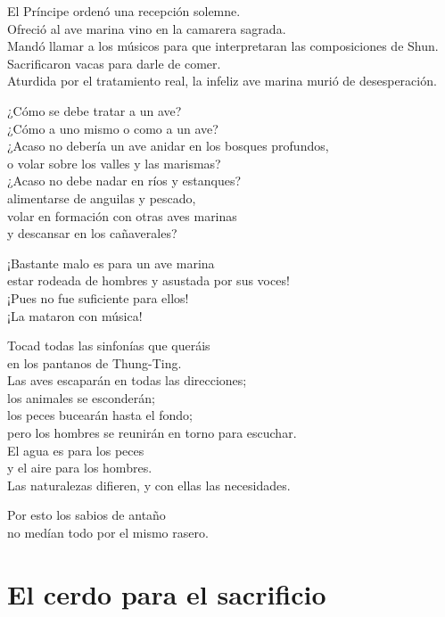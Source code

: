 \documentclass[hidelinks]{memoir}
\begin{document}
	El Príncipe ordenó una recepción solemne.\\
	Ofreció al ave marina vino en la camarera sagrada.\\
	Mandó llamar a los músicos para que interpretaran las composiciones de
	Shun.\\
	Sacrificaron vacas para darle de comer.\\
	Aturdida por el tratamiento real, la infeliz ave marina murió de
	desesperación.
	
	¿Cómo se debe tratar a un ave?\\
	¿Cómo a uno mismo o como a un ave?\\
	¿Acaso no debería un ave anidar en los bosques profundos,\\
	o volar sobre los valles y las marismas?\\
	¿Acaso no debe nadar en ríos y estanques?\\
	alimentarse de anguilas y pescado,\\
	volar en formación con otras aves marinas\\
	y descansar en los cañaverales?
	
	¡Bastante malo es para un ave marina\\
	estar rodeada de hombres y asustada por sus voces!\\
	¡Pues no fue suficiente para ellos!\\
	¡La mataron con música!
	
	Tocad todas las sinfonías que queráis\\
	en los pantanos de Thung-Ting.\\
	Las aves escaparán en todas las direcciones;\\
	los animales se esconderán;\\
	los peces bucearán hasta el fondo;\\
	pero los hombres se reunirán en torno para escuchar.\\
	El agua es para los peces\\
	y el aire para los hombres.\\
	Las naturalezas difieren, y con ellas las necesidades.
	
	Por esto los sabios de antaño\\
	no medían todo por el mismo rasero.
	
	\chapter*{El cerdo para el sacrificio}
	
\end{document}
